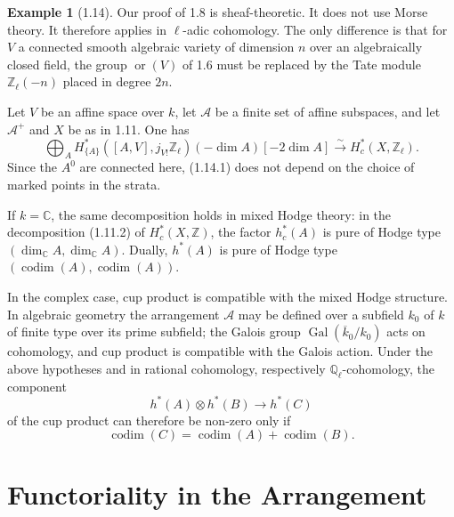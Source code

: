 \documentclass[11pt]{article}
\theoremstyle{definition}
\newtheorem{example}[theorem]{Example}
\newcommand{\ZZ}{\mathbb Z}
\newcommand{\QQ}{\mathbb Q}
\newcommand{\CC}{\mathbb C}
\newcommand{\codim}{\operatorname{codim}}
\newcommand{\ornt}{\operatorname{or}}
\begin{document}
\begin{example}[1.14]
Our proof of 1.8 is sheaf-theoretic.  It does not use Morse theory.  It therefore applies in $\ell$-adic cohomology.  The only difference is that for $V$ a connected smooth algebraic variety of dimension $n$ over an algebraically closed field, the group $\ornt(V)$ of 1.6 must be replaced by the Tate module $\ZZ_\ell(-n)$ placed in degree $2n$.

Let $V$ be an affine space over $k$, let $\mathcal A$ be a finite set of affine subspaces, and let $\mathcal A^+$ and $X$ be as in 1.11.  One has
\begin{equation}
\bigoplus_A H^*_{\{A\}}([A,V],j_{V!}\ZZ_\ell)(-\dim A)[-2\dim A]
\xrightarrow{\sim}H_c^*(X,\ZZ_\ell).\tag{1.14.1}
\end{equation}
Since the $A^0$ are connected here, (1.14.1) does not depend on the choice of marked points in the strata.

If $k=\CC$, the same decomposition holds in mixed Hodge theory: in the decomposition (1.11.2) of $H_c^*(X,\ZZ)$, the factor $h_c^*(A)$ is pure of Hodge type $(\dim_\CC A,\dim_\CC A)$.  Dually, $h^*(A)$ is pure of Hodge type $(\codim(A),\codim(A))$.

In the complex case, cup product is compatible with the mixed Hodge structure.  In algebraic geometry the arrangement $\mathcal A$ may be defined over a subfield $k_0$ of $k$ of finite type over its prime subfield; the Galois group $\operatorname{Gal}(\overline{k}_0/k_0)$ acts on cohomology, and cup product is compatible with the Galois action.  Under the above hypotheses and in rational cohomology, respectively $\QQ_\ell$-cohomology, the component
\[
h^*(A)\otimes h^*(B)\longrightarrow h^*(C)
\]
of the cup product can therefore be non-zero only if
\[
\codim(C)=\codim(A)+\codim(B).
\]
\end{example}

\section{Functoriality in the Arrangement}
\end{document}
